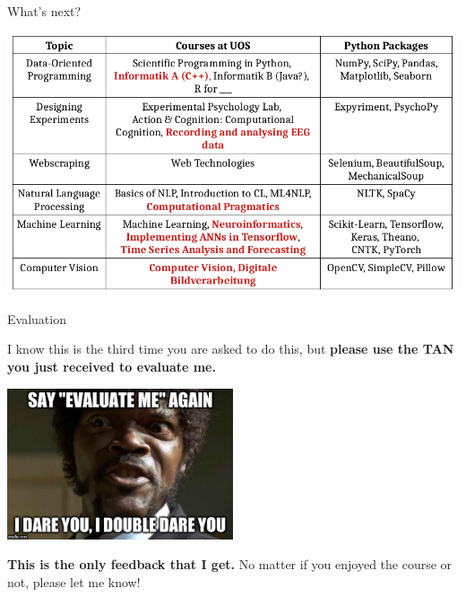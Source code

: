 \begin{frame}[fragile]{What's next?}

    \includegraphics[width=\textwidth]{13_Expyriment/table.png}


\end{frame}


\begin{frame}{Evaluation}

    I know this is the third time you are asked to do this, but \textbf{please use the TAN you just received to evaluate me.}

    \vspace{1em}

    \centering \includegraphics[width=0.5\textwidth]{13_Expyriment/jules.jpg}

    \vspace{1em}
    
    \textbf{This is the only feedback that I get.} No matter if you enjoyed the course or not, please let me know!


\end{frame}


